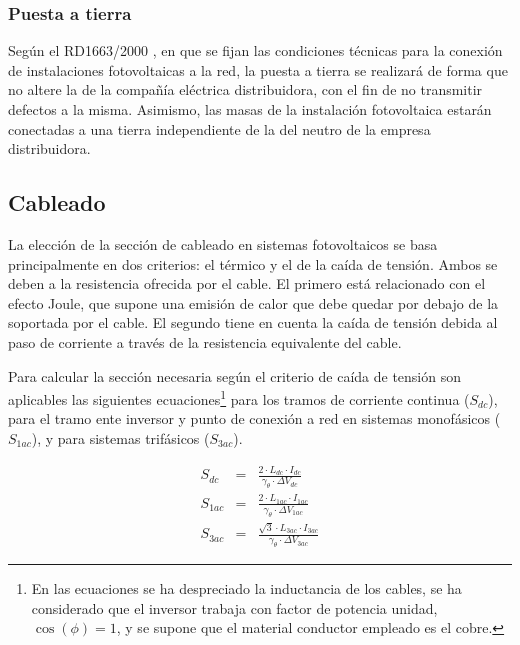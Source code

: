 \subsubsection{Puesta a tierra}

Según el RD1663/2000 \cite{RealDecreto2000}, en que se fijan las
condiciones técnicas para la conexión de instalaciones fotovoltaicas
a la red, la puesta a tierra se realizará de forma que no altere la
de la compañía eléctrica distribuidora, con el fin de no transmitir
defectos a la misma. Asimismo, las masas de la instalación fotovoltaica
estarán conectadas a una tierra independiente de la del neutro de
la empresa distribuidora.


\subsection{Cableado}

La elección de la sección de cableado en sistemas fotovoltaicos se
basa principalmente en dos criterios: el térmico y el de la caída de
tensión. Ambos se deben a la resistencia ofrecida por el cable.  El
primero está relacionado con el efecto Joule, que supone una emisión
de calor que debe quedar por debajo de la soportada por el cable.  El
segundo tiene en cuenta la caída de tensión debida al paso de
corriente a través de la resistencia equivalente del cable.

Para calcular la sección necesaria según el criterio de caída de
tensión son aplicables las siguientes ecuaciones\footnote{En las ecuaciones se ha despreciado la inductancia de los
  cables, se ha considerado que el inversor trabaja con factor de
  potencia unidad,
  $\cos(\phi)=1$, y se supone que el material
  conductor empleado es el cobre. %
} para los tramos de
corriente continua ($S_{dc}$), para el tramo ente
inversor y punto de conexión a red en sistemas monofásicos ($S_{1ac}$), y para sistemas trifásicos ($S_{3ac}$).

\[
  \begin{aligned}
    S_{dc} & = & \frac{2 \cdot L_{dc}\cdot I_{dc}}{\gamma_\theta \cdot \Delta V_{dc}}\\
    S_{1ac} & = & \frac{2\cdot L_{1ac}\cdot I_{1ac}}{\gamma_\theta \cdot \Delta V_{1ac}}\\
    S_{3ac} & = & \frac{\sqrt{3} \cdot L_{3ac}\cdot I_{3ac}}{\gamma_\theta \cdot \Delta V_{3ac}}
  \end{aligned}
\]


